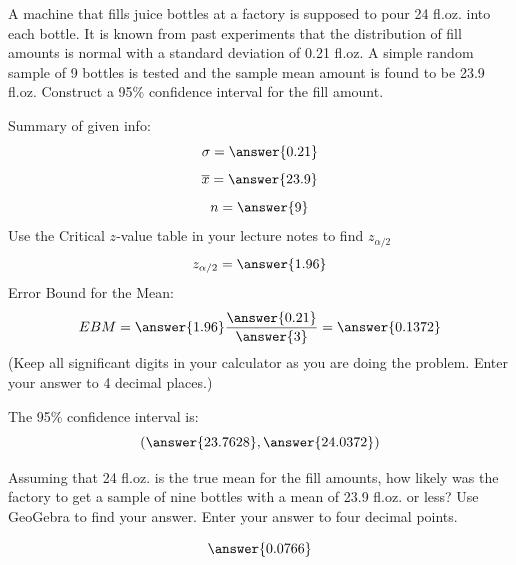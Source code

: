 \documentclass{ximera}
\begin{document}
\begin{problem}\label{prob:140hom6prob5}
A machine that fills juice bottles at a factory is supposed to pour 24 fl.oz. into each bottle.  It is known from past experiments that the distribution of fill amounts is normal with a standard deviation of 0.21 fl.oz. A simple random sample of 9 bottles is tested and the sample mean amount is found to be 23.9 fl.oz.  Construct a 95\% confidence interval for the fill amount. 

Summary of given info:
$$\sigma=\answer{0.21}$$
$$\overline{x}=\answer{23.9}$$
$$n=\answer{9}$$
Use the Critical $z$-value table in your lecture notes to find $z_{\alpha/2}$
$$z_{\alpha/2}=\answer{1.96}$$
Error Bound for the Mean:
$$EBM=\answer{1.96}\frac{\answer{0.21}}{\answer{3}}=\answer{0.1372}$$
(Keep all significant digits in your calculator as you are doing the problem.  Enter your answer to 4 decimal places.)

The 95\% confidence interval is:
$$(\answer{23.7628},\answer{24.0372})$$

Assuming that 24 fl.oz. is the true mean for the fill amounts, how likely was the factory to get a sample of nine bottles with a mean of 23.9 fl.oz. or less?  Use GeoGebra to find your answer.  Enter your answer to four decimal points.
\begin{center}  
\end{center}
$$\answer{0.0766}$$
\end{problem}
\end{document}
